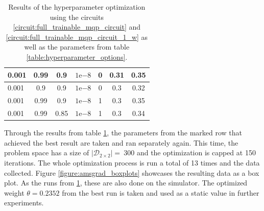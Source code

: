 \begin{table}[]
\begin{tabular}{lcccc|cc|}
\multicolumn{1}{|l|}{0.001}                         & \multicolumn{1}{c|}{0.99}                        & \multicolumn{1}{c|}{0.9}                          & \multicolumn{1}{c|}{$1\mathrm{e}{-8}$}                         & 0       & \multicolumn{1}{c|}{0.31}                         & 0.35    \\ \hline
\multicolumn{1}{|l|}{0.001}                         & \multicolumn{1}{c|}{0.9}                         & \multicolumn{1}{c|}{0.9}                          & \multicolumn{1}{c|}{$1\mathrm{e}{-8}$}                         & 0       & \multicolumn{1}{c|}{0.3}                          & 0.32    \\ \hline
\multicolumn{1}{|l|}{0.001}                         & \multicolumn{1}{c|}{0.99}                        & \multicolumn{1}{c|}{0.9}                          & \multicolumn{1}{c|}{$1\mathrm{e}{-8}$}                         & 1       & \multicolumn{1}{c|}{0.3}                          & 0.35    \\ \hline
\multicolumn{1}{|l|}{0.001}                         & \multicolumn{1}{c|}{0.99}                        & \multicolumn{1}{c|}{0.85}                         & \multicolumn{1}{c|}{$1\mathrm{e}{-8}$}                         & 1       & \multicolumn{1}{c|}{0.3}                          & 0.34    \\ \hline
\end{tabular}
    \caption{Results of the hyperparameter optimization using the circuits \ref{circuit:full_trainable_mqp_circuit} and \ref{circuit:full_trainable_mqp_circuit_1_w} as well as the parameters from table \ref{table:hyperparameter_options}.}
    \label{table:hyperparameter_results}
\end{table}

\newpage

Through the results from table \ref{table:hyperparameter_results}, the parameters from the marked row that achieved the best result are taken and ran separately again. This time, the problem space has a size of $\left|\mathcal{D}_{2\times2}\right| =\ 300$ and the optimization is capped at 150 iterations. The whole optimization process is run a total of 13 times and the data collected. Figure \ref{figure:amsgrad_boxplots} showcases the resulting data as a box plot. As the runs from \ref{table:hyperparameter_results}, these are also done on the simulator. The optimized weight $\theta = 0.2352$ from the best run is taken and used as a static value in further experiments.\par

